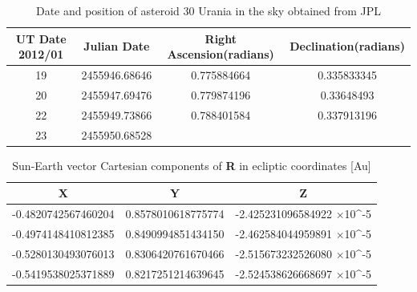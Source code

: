 \documentclass[letterpaper,12pt]{article}
\begin{document}
\FloatBarrier
\begin{table}[h!]
\caption{Date and position of asteroid 30 Urania in the sky obtained from JPL} %
\centering %
\begin{tabular}{| c | c | c | c |} %
\hline\hline %
UT Date 2012/01 & Julian Date & Right Ascension(radians) & Declination(radians) \\ [0.5ex] %
\hline %
19   &   2455946.68646  & 0.775884664&   0.335833345 \\ \hline
20   &   2455947.69476  & 0.779874196  & 0.33648493   \\ \hline
22   &   2455949.73866 &  0.788401584 & 0.337913196    \\  \hline
23   &   2455950.68528  &  &     \\ [1ex] %
\hline %
\end{tabular}
\label{table:nonlin} %
\end{table}
\FloatBarrier




\FloatBarrier
\begin{table}[h!]
\caption{Sun-Earth vector Cartesian components of {\bf R} in ecliptic coordinates [Au]} %
\centering %
\begin{tabular}{| c | c | c |} %
\hline\hline %
X & Y & Z \\ [0.5ex] %
\hline %
-0.4820742567460204  & 0.8578010618775774  &  -2.425231096584922 \begin{math} \times \end{math}10^{-5} \\ \hline
-0.4974148410812385  & 0.8490994851434150  &  -2.462584044959891 \begin{math} \times \end{math}10^{-5} \\ \hline
-0.5280130493076013  & 0.8306420761670466  &  -2.515673232526080 \begin{math} \times \end{math}10^{-5} \\  \hline
-0.5419538025371889  & 0.8217251214639645  &  -2.524538626668697 \begin{math} \times \end{math}10^{-5}  \\ [1ex] %
\hline %
\end{tabular}
\label{table:nonlin} %
\end{table}
\FloatBarrier
\end{document}
